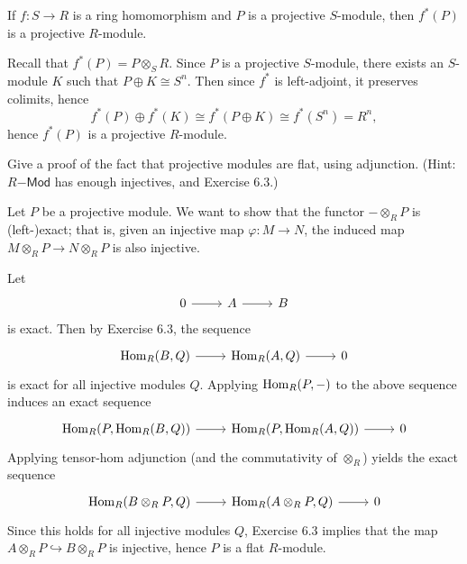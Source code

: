\documentclass[../../master.tex]{subfiles}
\begin{document}
\begin{problem}
    If $f: S \to R$ is a ring homomorphism and $P$ is a projective $S$-module, then $f^{*}(P)$ is a projective $R$-module.
\end{problem}

\begin{solution}
    Recall that $f^{*}(P) = P \otimes_S R$.
    Since $P$ is a projective $S$-module, there exists an $S$-module $K$ such that $P \oplus K \cong S^{n}$.
    Then since $f^{*}$ is left-adjoint, it preserves colimits, hence
    \[
    f^{*}(P) \oplus f^{*}(K) \cong f^{*}(P \oplus K) \cong f^{*}(S^{n}) = R^{n},
    \]
    hence $f^{*}(P)$ is a projective $R$-module.
\end{solution}

\begin{problem}
    Give a proof of the fact that projective modules are flat, using adjunction.
    (Hint: $R\mathsf{-Mod}$ has enough injectives, and Exercise 6.3.)
\end{problem}

\begin{solution}
    Let $P$ be a projective module.
    We want to show that the functor $- \otimes_R P$ is (left-)exact;
    that is, given an injective map $\varphi : M \to N$, the induced map $M \otimes_R P \to N \otimes_R P$ is also injective.

    Let
    \[
    \begin{tikzcd}
        0 & A & B
        \arrow[from=1-1, to=1-2] 
        \arrow[from=1-2, to=1-3] 
    \end{tikzcd}
    \]
    is exact.
    Then by Exercise 6.3, the sequence
    \[
    \begin{tikzcd}
        \Hom_R(B, Q) & \Hom_R(A, Q) & 0
        \arrow[from=1-1, to=1-2]
        \arrow[from=1-2, to=1-3] 
    \end{tikzcd}
    \]
    is exact for all injective modules $Q$.
    Applying $\operatorname{Hom}_R(P, -)$ to the above sequence induces an exact sequence
    \[
    \begin{tikzcd}
        \Hom_R(P, \Hom_R(B, Q)) & \Hom_R(P, \Hom_R(A, Q)) & 0
        \arrow[from=1-1, to=1-2]
        \arrow[from=1-2, to=1-3]
    \end{tikzcd}
    \]
    Applying tensor-hom adjunction (and the commutativity of $\otimes_R$) yields the exact sequence
    \[
    \begin{tikzcd}
        \Hom_R(B \otimes_R P, Q) & \Hom_R(A \otimes_R P, Q) & 0
        \arrow[from=1-1, to=1-2]
        \arrow[from=1-2, to=1-3]
    \end{tikzcd}
    \]
    Since this holds for all injective modules $Q$, Exercise 6.3 implies that the map $A \otimes_R P \hookrightarrow B \otimes_R P$ is injective, hence $P$ is a flat $R$-module.
\end{solution}
\end{document}
